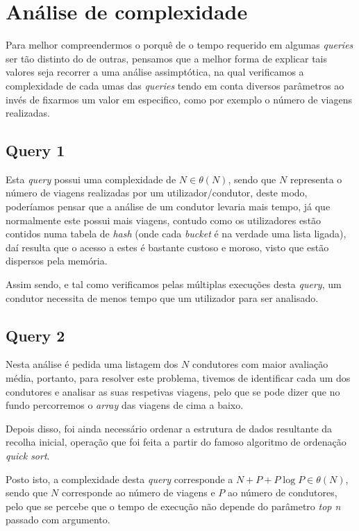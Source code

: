 \documentclass[12pt,a4paper]{report}
\begin{document}
\chapter{Análise de complexidade}

Para melhor compreendermos o porquê de o tempo requerido em algumas \textit{queries} ser tão distinto do de outras, pensamos que a melhor forma de explicar tais valores seja recorrer a uma análise assimptótica, na qual verificamos a complexidade de cada umas das \textit{queries} tendo em conta diversos parâmetros ao invés de fixarmos um valor em especifico, como por exemplo o número de viagens realizadas. 

\section{Query 1}

Esta \textit{query} possui uma complexidade de \( N \in \theta(N)\), sendo que \(N\) representa o número de viagens realizadas por um utilizador/condutor, deste modo, poderíamos pensar que a análise de um condutor levaria mais tempo, já que normalmente este possui mais viagens, contudo como os utilizadores estão contidos numa tabela de \textit{hash} (onde cada \textit{bucket} é na verdade uma lista ligada), daí resulta que o acesso a estes é bastante custoso e moroso, visto que estão dispersos pela memória.

Assim sendo, e tal como verificamos pelas múltiplas execuções desta \textit{query}, um condutor necessita de menos tempo que um utilizador para ser analisado.

\section{Query 2}

Nesta análise é pedida uma listagem dos \(N\) condutores com maior avaliação média, portanto, para resolver este problema, tivemos de identificar cada um dos condutores e analisar as suas respetivas viagens, pelo que se pode dizer que no fundo percorremos o \textit{array} das viagens de cima a baixo.

Depois disso, foi ainda necessário ordenar a estrutura de dados resultante da recolha inicial, operação que foi feita a partir do famoso algoritmo de ordenação \textit{quick sort}.

Posto isto, a complexidade desta \textit{query} corresponde a \(N + P + P\log P \in\theta(N)\), sendo que \(N\) corresponde ao número de viagens e \(P\) ao número de condutores, pelo que se percebe que o tempo de execução não depende do parâmetro \textit{top n} passado com argumento.
\end{document}
